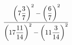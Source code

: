 \begin{ex}[type=calculate]
	\begin{condition}
		\( \cfrac{\left( 7\dfrac{3}{7} \right)^2-\left( \dfrac{6}{7} \right)^2}{\left( 17\dfrac{11}{14} \right)^2-\left( 11\dfrac{3}{14} \right)^2} \)
	\end{condition}
\end{ex}
